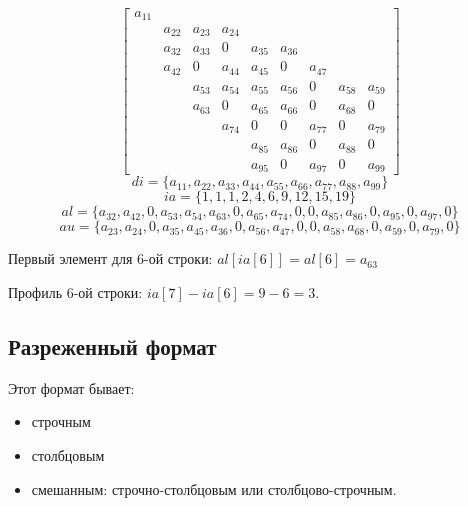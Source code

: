 \begin{example}
    \[\begin{bmatrix}
            a_{11} &                                                                       \\
                   & a_{22} & a_{23} & a_{24}                                              \\
                   & a_{32} & a_{33} & 0      & a_{35} & a_{36}                            \\
                   & a_{42} & 0      & a_{44} & a_{45} & 0      & a_{47}                   \\
                   &        & a_{53} & a_{54} & a_{55} & a_{56} & 0      & a_{58} & a_{59} \\
                   &        & a_{63} & 0      & a_{65} & a_{66} & 0      & a_{68} & 0      \\
                   &        &        & a_{74} & 0      & 0      & a_{77} & 0      & a_{79} \\
                   &        &        &        & a_{85} & a_{86} & 0      & a_{88} & 0      \\
                   &        &        &        & a_{95} & 0      & a_{97} & 0      & a_{99}
        \end{bmatrix} \]
    \[di = \{a_{11}, a_{22}, a_{33}, a_{44}, a_{55}, a_{66}, a_{77}, a_{88}, a_{99}\}\]
    \[ia = \{1, 1, 1, 2, 4, 6, 9, 12, 15, 19\}\]
    \[al = \{a_{32}, a_{42}, 0, a_{53}, a_{54}, a_{63}, 0, a_{65}, a_{74}, 0, 0, a_{85}, a_{86}, 0, a_{95},  0, a_{97}, 0\}\]
    \[au = \{a_{23}, a_{24}, 0, a_{35}, a_{45}, a_{36}, 0, a_{56}, a_{47}, 0, 0, a_{58}, a_{68}, 0, a_{59}, 0, a_{79}, 0\} \]

    Первый элемент для 6-ой строки: \(al[ia[6]] = al[6] = a_{63}\)

    Профиль 6-ой строки: \(ia[7] - ia[6] = 9 - 6 = 3\).
\end{example}

\subsection{Разреженный формат}

Этот формат бывает:
\begin{itemize}
    \item строчным
    \item столбцовым
    \item смешанным: строчно-столбцовым или столбцово-строчным.
\end{itemize}
